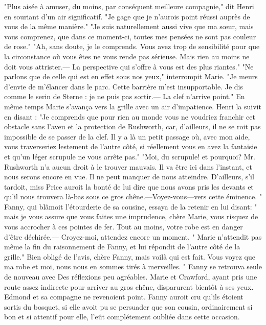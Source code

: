 "Plus aisée à amuser, du moins, par conséquent meilleure compagnie," dit Henri en souriant d’un air significatif. "Je gage que je n’aurois point réussi auprès de vous de la même manière."
"Je suis naturellement aussi vive que ma sœur, mais vous comprenez, que dans ce moment-ci, toutes mes pensées ne sont pas couleur de rose."
"Ah, sans doute, je le comprends. Vous avez trop de sensibilité pour que la circonstance où vous êtes ne vous rende pas sérieuse. Mais rien au moins ne doit vous attrister.— La perspective qui s’offre à vous est des plus riantes."
"Ne parlons que de celle qui est en effet sous nos yeux," interrompit Marie. "Je meurs d’envie de m’élancer dans le parc. Cette barrière m’est insupportable. Je dis comme le serin de Sterne : je ne puis pas sortir.— La clef n’arrive point." En même temps Marie s’avança vers la grille avec un air d’impatience.
Henri la suivit en disant : "Je comprends que pour rien au monde vous ne voudriez franchir cet obstacle sans l’aveu et la protection de Rushworth, car, d’ailleurs, il ne se\setcounter{page}{522} roit pas impossible de se passer de la clef. Il y a là un petit passage où, avec mon aide, vous traverseriez lestement de l’autre côté, si réellement vous en avez la fantaisie et qu’un léger scrupule ne vous arrête pas."
"Moi, du scrupule! et pourquoi? Mr. Rushworth n’a aucun droit à le trouver mauvais. Il va être ici dans l’instant, et nous serons encore en vue. Il ne peut manquer de nous atteindre. D’ailleurs, s’il tardoit, miss Price auroit la bonté de lui dire que nous avons pris les devants et qu’il nous trouvera là-bas sous ce gros chêne.—Voyez-vous—vers cette éminence. "
Fanny, qui blâmoit l’étourderie de sa cousine, essaya de la retenir en lui disant: " mais je vous assure que vous faites une imprudence, chère Marie, vous risquez de vous accrocher à ces pointes de fer. Tout au moins, votre robe est en danger d’être déchirée.— Croyez-moi, attendez encore un moment. "
Marie n’attendit pas même la fin du raisonnement de Fanny, et lui répondit de l’autre côté de la grille." Bien obligé de l’avis, chère Fanny, mais voilà qui est fait. Vous voyez que ma robe et moi, nous nous en sommes tirés à merveilles. "
Fanny se retrouva seule de nouveau avec\setcounter{page}{523} Des réflexions peu agréables. Marie et Crawford, ayant pris une route assez indirecte pour arriver au gros chêne, disparurent bientôt à ses yeux. Edmond et sa compagne ne revenoient point. Fanny auroit cru qu'ils étoient sortis du bosquet, si elle avoit pu se persuader que son cousin, ordinairement si bon et si attentif pour elle, l'eût complétement oubliée dans cette occasion.
